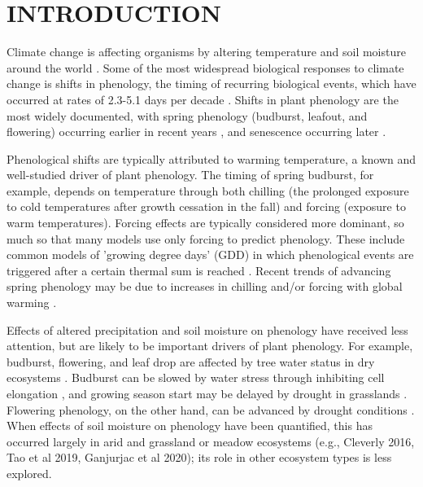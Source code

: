 \documentclass{article}
\begin{document}
\section* {INTRODUCTION} 
\par Climate change is affecting organisms by altering temperature and soil moisture around the world \citep{parmesan2006,chen2011}. Some of the most widespread biological responses to climate change is shifts in phenology, the timing of recurring biological events, which have occurred at rates of 2.3-5.1 days per decade \citep{parmesan2006,poloczanska2013,root2003}. Shifts in plant phenology are the most widely documented, with spring phenology (budburst, leafout, and flowering) occurring earlier in recent years \citep{wolkovich2012}, and senescence occurring later \citep{taylor2008,delpierre2009}. 
\par Phenological shifts are typically attributed to warming temperature, a known and well-studied driver of plant phenology. The timing of spring budburst, for example, depends on temperature through both chilling (the prolonged exposure to cold temperatures after growth cessation in the fall) and forcing (exposure to warm temperatures). Forcing effects are typically considered more dominant, so much so that many models use only forcing to predict phenology. These include common models of 'growing degree days' (GDD) in which phenological events are triggered after a certain thermal sum is reached \citep[e.g., ][]{olsson2014process}. Recent trends of advancing spring phenology may be due to increases in chilling and/or forcing with global warming \citep{fujisawa2010, ibanez2010,cook2012b}. %
\par Effects of altered precipitation and soil moisture on phenology have received less attention, but are likely to be important drivers of plant phenology. For example, budburst, flowering, and leaf drop are affected by tree water status in dry ecosystems \citep[e.g., ][]{essiamah1986,reich1984, van1993}. Budburst can be slowed by water stress through inhibiting cell elongation \citep{essiamah1986}, and growing season start may be delayed by drought in grasslands \cite{cui2017}. Flowering phenology, on the other hand, can be advanced by drought conditions \citep{hamann2018}. When effects of soil moisture on phenology have been quantified, this has occurred largely in arid and grassland or meadow ecosystems (e.g., Cleverly 2016, Tao et al 2019, Ganjurjac et al 2020); its role in other ecosystem types is less explored. 
\end{document}
